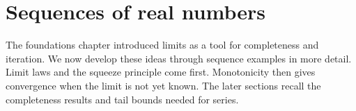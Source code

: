 \chapter{Sequences of real numbers}
\label{ch:analysis-i:sequences-of-real-numbers}

The foundations chapter introduced limits as a tool for completeness
and iteration. We now develop these ideas through sequence examples in more
detail. Limit laws and the squeeze principle come first. Monotonicity
then gives convergence when the limit is not yet known. The later
sections recall the completeness results and tail bounds needed for series.






